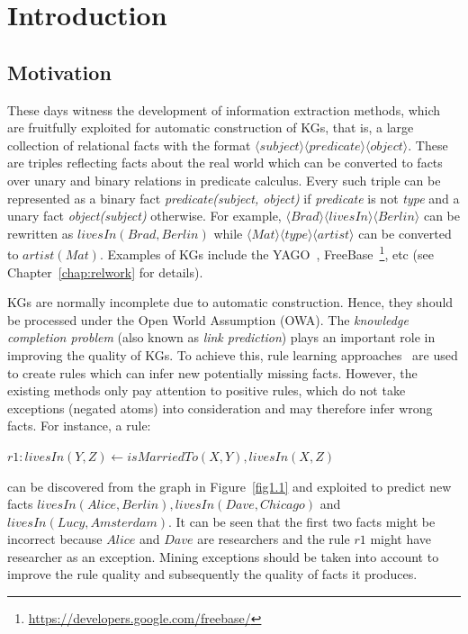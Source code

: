 \chapter{Introduction}
\label{chap:intro}

\section{Motivation}
\label{chap:motivation}

These days witness the development of information extraction methods, which are fruitfully exploited for automatic construction of KGs, that is, a large collection of relational facts with the format $\langle subject \rangle \langle predicate \rangle \langle object \rangle$. These are triples reflecting facts about the real world which can be converted to facts over unary and binary relations in predicate calculus. Every such triple can be represented as a binary fact \textit{predicate(subject, object)} if \textit{predicate} is not \textit{type} and a unary fact \textit{object(subject)} otherwise. For example, $\langle Brad \rangle \langle livesIn \rangle \langle Berlin \rangle$ can be rewritten as $livesIn(Brad, Berlin)$ while $\langle Mat \rangle \langle type \rangle \langle artist \rangle$ can be converted to $artist(Mat)$. Examples of KGs include the YAGO~\cite{ref28}, FreeBase~\footnote{\url{https://developers.google.com/freebase/}}, etc (see Chapter~\ref{chap:relwork} for details).

KGs are normally incomplete due to automatic construction. Hence, they should be processed under the Open World Assumption (OWA). The \textit{knowledge completion problem} (also known as \textit{link prediction}) plays an important role in improving the quality of KGs. To achieve this, rule learning approaches~\cite{ref39, ref10} are used to create rules which can infer new potentially missing facts. However, the existing methods only pay attention to positive rules, which do not take exceptions (negated atoms) into consideration and may therefore infer wrong facts. For instance, a rule:

\begin{center}
$r1: livesIn(Y,Z) \leftarrow isMarriedTo(X,Y), livesIn(X,Z)$
\end{center}

can be discovered from the graph in Figure~\ref{fig1.1} and exploited to predict new facts $livesIn(Alice, Berlin), livesIn(Dave, Chicago)$ and $livesIn(Lucy, Amsterdam)$. It can be seen that the first two facts might be incorrect because $Alice$ and $Dave$ are researchers and the rule $r1$ might have researcher as an exception. Mining exceptions should be taken into account to improve the rule quality and subsequently the quality of facts it produces.


